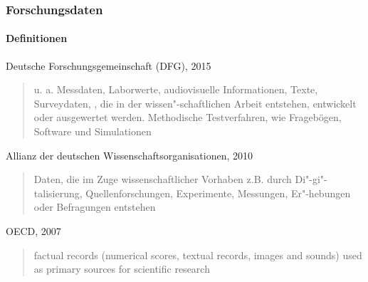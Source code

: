 \begin{frame}
    \frametitle{Forschungsdaten}
    \framesubtitle{Definitionen}

    \begin{block}{Deutsche Forschungsgemeinschaft (DFG), 2015}
        \blockquote[][.]{\textelp{} u. a. Messdaten, Laborwerte, audiovisuelle Informationen,
            Texte, Surveydaten, \textelp{}, die in der wissen"-schaftlichen Arbeit entstehen,
            entwickelt oder ausgewertet werden. Methodische Testverfahren, wie Fragebögen, Software und
        Simulationen \textelp{}}
    \end{block}


    \begin{block}{Allianz der deutschen Wissenschaftsorganisationen, 2010}
        \blockquote[][.]{\textelp{} Daten, die im Zuge wissenschaftlicher Vorhaben z.B. durch 
        Di"-gi"-talisierung, Quellenforschungen, Experimente, Messungen, Er"-hebungen oder Befragungen entstehen}
    \end{block}

    \begin{block}{OECD, 2007}
        \foreignblockquote{english}[][.]{\textelp{} factual records (numerical scores, textual records, images and
        sounds) used as primary sources for scientific research \textelp{}}
    \end{block}
\end{frame}
